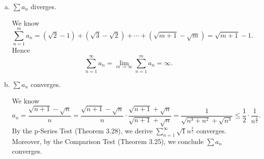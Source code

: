 \begin{Exercise}
	\begin{enumerate}[a)]
		\item
		\begin{answer}
			$\sum a_n$ diverges.
		\end{answer}
		\begin{solution}
			We know
			$$
			\sum_{n=1}^{m} a_n
			= (\sqrt{2} - 1) + (\sqrt{3} - \sqrt{2}) + \cdots + (\sqrt{m+1} - \sqrt{m})
			= \sqrt{m+1} - 1.
			$$
			Hence
			$$
			\sum_{n=1}^{\infty} a_n
			= \lim_{m\to\infty} \sum_{n=1}^{m} a_n
			= \infty.
			$$
		\end{solution}
	
		\item
		\begin{answer}
			$\sum a_n$ converges.
		\end{answer}
		\begin{solution}
			We know
			$$
			a_n
			= \frac{\sqrt{n+1} - \sqrt{n}}{n}
			= \frac{\sqrt{n+1} - \sqrt{n}}{n} \cdot \frac{\sqrt{n+1}+\sqrt{n}}{\sqrt{n+1}+\sqrt{n}}
			= \frac{1}{\sqrt{n^3+n^2} + \sqrt{n^3}}
			\leq \frac{1}{2} \cdot \frac{1}{n^{\frac{3}{2}}}.
			$$
			By the p-Series Test (Theorem 3.28), we derive $\sum_{n=1}^{\infty} \sqrt{1}{n^{\frac{3}{2}}}$ converges.
			Moreover, by the Comparison Test (Theorem 3.25), we conclude $\sum a_n$ converges.
		\end{solution}
	\end{enumerate}
\end{Exercise}